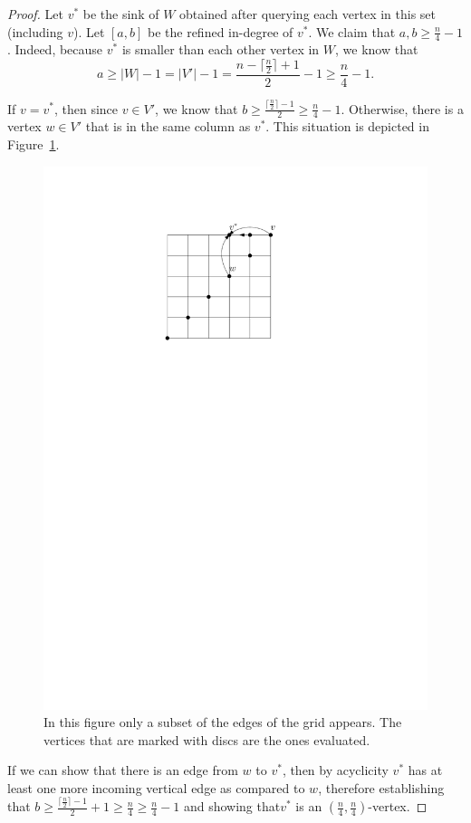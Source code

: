 \documentclass[a4paper,10pt]{article}
\newcommand{\indegree}{refined in-degree\xspace}
\begin{document}
\begin{proof}
Let $v^*$ be the sink of $W$ obtained after querying each vertex in this set (including $v$). Let $[a,b]$ be the \indegree of $v^*$. We claim that $a, b \geq \frac{n}{4} - 1$. 
Indeed, because $v^*$ is smaller than each other vertex in $W$, we know that $$a \geq |W|-1 = |V'|-1 = \frac{n-\lceil \frac{n}{2}\rceil + 1}{2} - 1 \geq \frac{n}{4} - 1.$$


If $v = v^*$, then since $v\in V'$, we know that $b\geq \frac{\lceil \frac{n}{2}\rceil-1}{2}\geq \frac{n}{4} - 1$.
Otherwise, there is a vertex $w \in V'$ that is in the same column as $v^*$.
  This situation is depicted in Figure~\ref{fig:seedlem1}.
  \begin{figure}[htbp] 
  	\centering
  	\includegraphics[scale=0.7]{seedlemma_fig1.pdf}
  	\caption{In this figure only a subset of the edges of the grid appears. The vertices that are marked with discs are the ones evaluated.} 
  	\label{fig:seedlem1}
  \end{figure}
   If we can show that there is an edge from $w$ to $v^*$, then by acyclicity $v^*$ has at least one more incoming vertical edge as compared to $w$, therefore establishing that $b \geq \frac{\lceil \frac{n}{2}\rceil-1}{2} + 1 \geq \frac{n}{4} \geq \frac{n}{4} - 1$ and showing that$v^*$ is an $(\frac{n}{4}, \frac{n}{4})$-vertex. 
   

\end{proof}
\end{document}
